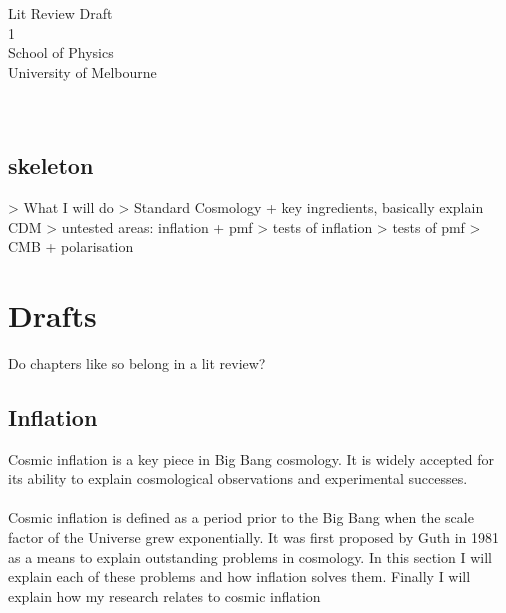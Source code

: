 \documentclass[12pt]{report}
\begin{document}
\thispagestyle{empty}
\begin{center}
\vspace{1cm}
\Huge{}\\
\vspace{2cm}
\Large{}\\
\vspace{2cm} %
\large{
Lit Review Draft\\
1}\\
\vspace{1cm}
\Large{School of Physics}\\
\large{University of Melbourne}\\
\vspace{.5cm}
\vspace{1cm}
\Large{}\\
\vspace{1.cm}
\normalsize
\\
\end{center}

\tableofcontents

\newpage

\vspace*{\fill}
\section*{skeleton}
> What I will do
> Standard Cosmology + key ingredients, basically explain \lambda CDM
> untested areas: inflation + pmf
> tests of inflation
> tests of pmf
> CMB + polarisation
\section*{}
\vspace*{\fill}
\chapter{Drafts}
Do chapters like so belong in a lit review?
\section{Inflation}
Cosmic inflation is a key piece in Big Bang cosmology. It is widely accepted for its ability to explain cosmological observations and experimental successes.
\\\\
Cosmic inflation is defined as a period prior to the Big Bang when the scale factor of the Universe grew exponentially. It was first proposed by Guth in 1981 as a means to explain outstanding problems in cosmology. In this section I will explain each of these problems and how inflation solves them. Finally I will explain how my research relates to cosmic inflation
\end{document}
